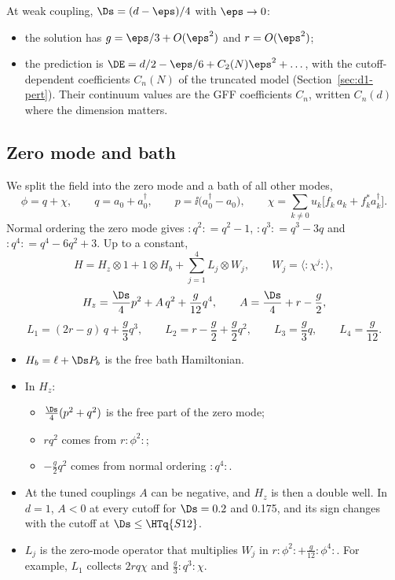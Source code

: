 At weak coupling, $\Ds=(d-\eps)/4$ with $\eps\to0$:
\begin{itemize}
\item the solution has $g=\eps/3+O(\eps^2)$ and $r=O(\eps^2)$;
\item the prediction is $\DE=d/2-\eps/6+C_2(N)\eps^2+\dots$, with the cutoff-dependent coefficients $C_n(N)$ of the
 truncated model (Section~\ref{sec:d1-pert}). Their continuum values are the GFF coefficients $C_n$, written $C_n(d)$
 where the dimension matters.
\end{itemize}

\subsection{Zero mode and bath}\label{sec:split}
We split the field into the zero mode and a bath of all other modes,
\begin{equation}
 \phi=q+\chi,\qquad q=a_0+a_0^\dagger,\qquad p=\ii\big(a_0^\dagger-a_0\big),\qquad
 \chi=\sum_{k\neq0}u_k\big[f_k\,a_k+f_k^*a_k^\dagger\big].
 \label{eq:split}
\end{equation}
Normal ordering the zero mode gives ${:}q^2{:}=q^2-1$, ${:}q^3{:}=q^3-3q$ and ${:}q^4{:}=q^4-6q^2+3$. Up to a
constant,
\begin{equation}
 H=H_z\otimes1+1\otimes H_b+\sum_{j=1}^4L_j\otimes W_j,\qquad W_j=\big\langle{:}\chi^j{:}\big\rangle ,
 \label{eq:Hsplit}
\end{equation}
\begin{equation}
 H_z=\frac{\Ds}4p^2+A\,q^2+\frac g{12}q^4,\qquad A=\frac{\Ds}4+r-\frac g2 ,
 \label{eq:Hz}
\end{equation}
\begin{equation}
 L_1=(2r-g)\,q+\frac g3q^3,\qquad L_2=r-\frac g2+\frac g2q^2,\qquad L_3=\frac g3q,\qquad L_4=\frac g{12} .
 \label{eq:Lj}
\end{equation}
\begin{itemize}
\item $H_b=\ell+\Ds P_b$ is the free bath Hamiltonian.
\item In $H_z$:
 \begin{itemize}
 \item $\frac{\Ds}4(p^2+q^2)$ is the free part of the zero mode;
 \item $r q^2$ comes from $r{:}\phi^2{:}$;
 \item $-\frac g2q^2$ comes from normal ordering ${:}q^4{:}$.
 \end{itemize}
\item At the tuned couplings $A$ can be negative, and $H_z$ is then a double well. In $d=1$, $A<0$ at every cutoff for
 $\Ds=0.2$ and 0.175, and its sign changes with the cutoff at $\Ds\le\HTq{S12}$.
\item $L_j$ is the zero-mode operator that multiplies $W_j$ in $r{:}\phi^2{:}+\frac g{12}{:}\phi^4{:}$. For example,
 $L_1$ collects $2rq\chi$ and $\frac g3{:}q^3{:}\chi$.
\end{itemize}

